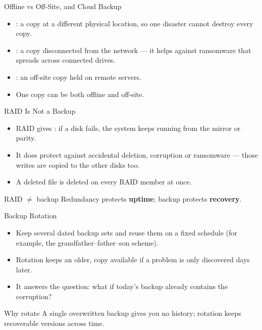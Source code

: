 \documentclass[aspectratio=169]{beamer}
\begin{document}
\begin{frame}{Offline vs Off-Site, and Cloud Backup}
  \begin{itemize}
    \item {}: a copy at a different physical location, so one
      disaster cannot destroy every copy.
    \item {}: a copy disconnected from the network --- it helps
      against ransomware that spreads across connected drives.
    \item {}: an off-site copy held on remote servers.
    \item One copy can be both offline and off-site.
  \end{itemize}
\end{frame}

\begin{frame}{RAID Is Not a Backup}
  \begin{itemize}
    \item RAID gives : if a disk fails, the system keeps
      running from the mirror or parity.
    \item It does  protect against accidental deletion, corruption
      or ransomware --- those writes are copied to the other disks too.
    \item A deleted file is deleted on every RAID member at once.
  \end{itemize}
  \begin{alertblock}{RAID $\neq$ backup}
    Redundancy protects \textbf{uptime}; backup protects \textbf{recovery}.
  \end{alertblock}
\end{frame}

\begin{frame}{Backup Rotation}
  \begin{itemize}
    \item Keep several dated backup sets and reuse them on a fixed schedule
      (for example, the grandfather--father--son scheme).
    \item Rotation keeps an older,  copy available if a problem
      is only discovered days later.
    \item It answers the question: what if today's backup already contains
      the corruption?
  \end{itemize}
  \begin{block}{Why rotate}
    A single overwritten backup gives you no history; rotation keeps
    recoverable versions across time.
  \end{block}
\end{frame}
\end{document}
